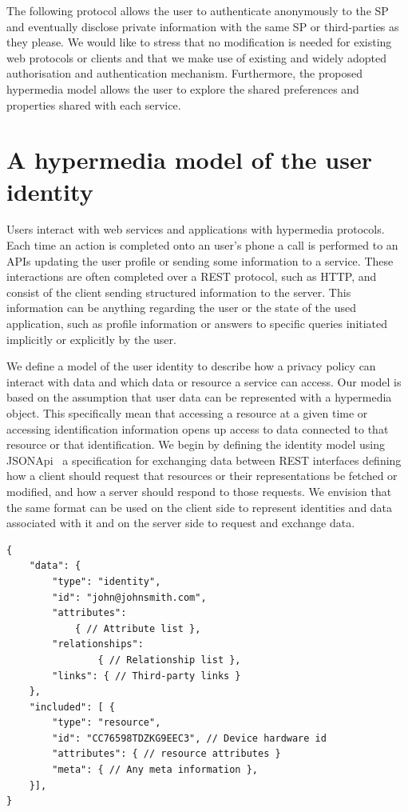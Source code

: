 The following protocol allows the user to authenticate anonymously to the SP and eventually disclose private information with the same SP or third-parties as they please. We would like to stress that no modification is needed for existing web protocols or clients and that we make use of existing and widely adopted authorisation and authentication mechanism. Furthermore, the proposed hypermedia model allows the user to explore the shared preferences and properties shared with each service.

\section{A hypermedia model of the user identity}

Users interact with web services and applications with hypermedia protocols. Each time an action is completed onto an user's phone a call is performed to an APIs updating the user profile or sending some information to a service. These interactions are often completed over a REST protocol, such as HTTP, and consist of the client sending structured information to the server. This information can be anything regarding the user or the state of the used application, such as profile information or answers to specific queries initiated implicitly or explicitly by the user.

We define a model of the user identity to describe how a privacy policy can interact with data and which data or resource a service can access. Our model is based on the assumption that user data can be represented with a hypermedia object. This specifically mean that accessing a resource at a given time or accessing identification information opens up access to data connected to that resource or that identification. We begin by defining the identity model using JSONApi~\cite{Jsonapi} a specification for exchanging data between REST interfaces defining how a client should request that resources or their representations be fetched or modified, and how a server should respond to those requests. We envision that the same format can be used on the client side to represent identities and data associated with it and on the server side to request and exchange data.

\begin{lstlisting}
{
    "data": {
        "type": "identity",
        "id": "john@johnsmith.com",
        "attributes":
            { // Attribute list },
        "relationships":
                { // Relationship list },
        "links": { // Third-party links }
    },
    "included": [ {
        "type": "resource",
        "id": "CC76598TDZKG9EEC3", // Device hardware id
        "attributes": { // resource attributes }
        "meta": { // Any meta information },
    }],
}
\end{lstlisting}


